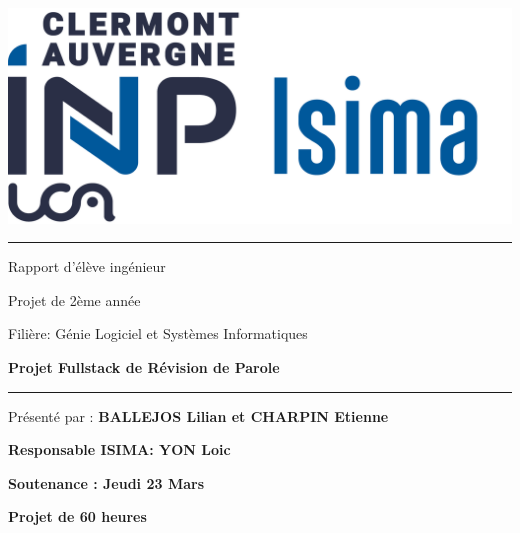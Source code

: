 \documentclass[12pt,french]{article}
\begin{document}
\begin{titlepage} %

  
  \begin{center}
  	\includegraphics[scale=0.35]{isima.png}
  \end{center}
  
  
  \vspace*{3cm} %
  
  \hrule
  
  \begin{center}
  	\large
  	Rapport d'élève ingénieur
  	
  	Projet de 2ème année
  	
  	Filière: Génie Logiciel et Systèmes Informatiques
  	
  	\huge
  	\textbf{Projet Fullstack de Révision de Parole}
  \end{center}

\hrule
  
  \vspace*{1.8cm} 
  
  \begin{center}
 
  	
  \Large Présenté par : \textbf{BALLEJOS Lilian et CHARPIN Etienne}
  
   \end{center}

\vspace*{7cm}
  
  
  
  
  	\begin{minipage}{.45\linewidth}
  		\begin{flushleft}
  			\textbf{Responsable ISIMA: YON Loic}
  			
  			\textbf{Soutenance : Jeudi 23 Mars}
  		\end{flushleft}
  	\end{minipage}
  	\hfill
  	\begin{minipage}{.45\linewidth}
  		\begin{flushright}
  			\textbf{Projet de 60 heures}
  			

\end{flushright}
\end{minipage}
\end{titlepage}
\end{document}
